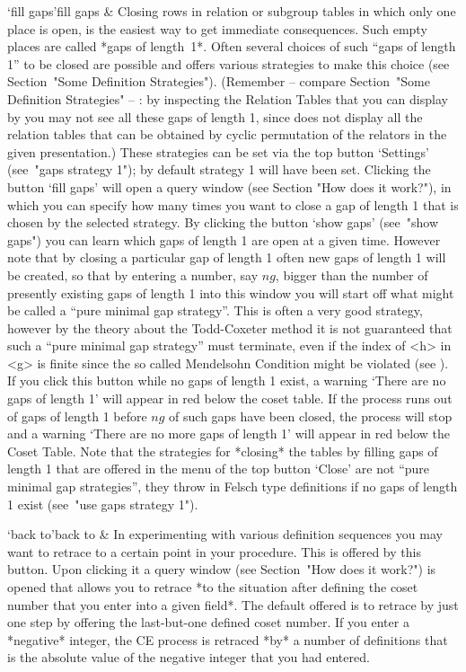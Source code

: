 \>`fill gaps'{fill gaps} &
  Closing rows in relation or subgroup tables in which only one place is
  open, is the easiest way to get immediate consequences. Such empty
  places are called *gaps of length~1*. Often several choices of such
  ``gaps of length 1'' to be closed are possible and {\ITC} offers
  various strategies to make this choice (see Section~"Some Definition
  Strategies"). (Remember -- compare Section~"Some Definition
  Strategies" -- : by inspecting the Relation Tables that you can
  display by {\ITC} you may not see all these gaps of length 1, since
  {\ITC} does not display all the relation tables that can be obtained
  by cyclic permutation of the relators in the given presentation.)
  These strategies can be set via the top button `Settings' (see~"gaps
  strategy 1"); by default strategy 1 will have been set. Clicking
  the button `fill gaps' will open a query window (see Section "How does
  it work?"), in which you can specify how many times you want to close
  a gap of length 1 that is chosen by the selected strategy. By
  clicking the button `show gaps' (see~"show gaps") you can learn which
  gaps of length 1 are open at a given time. However note that by
  closing a particular gap of length 1 often new gaps of length 1
  will be created, so that by entering a number, say $ng$, bigger than
  the number of presently existing gaps of length 1 into this window
  you will start off what might be called a ``pure minimal gap strategy''.
  This is often a very good strategy, however by the theory about the
  Todd-Coxeter method it is not guaranteed that such a ``pure minimal gap
  strategy'' must terminate, even if the index of <h> in <g> is finite
  since the so called Mendelsohn Condition might be violated (see
  \cite{Neu82}). If you click this button while no gaps of length 1
  exist, a warning `There are no gaps of length 1' will appear in red
  below the coset table. If the process runs out of gaps of length 1
  before $ng$ of such gaps have been closed, the process will stop and a
  warning `There are no more gaps of length 1' will appear in red below
  the Coset Table. Note that the strategies for *closing* the tables by
  filling gaps of length 1 that are offered in the menu of the top
  button `Close' are not ``pure minimal gap strategies'', they throw in
  Felsch type definitions if no gaps of length 1 exist (see~"use gaps
  strategy 1").



\>`back to'{back to} &
  In experimenting with various definition sequences you may want to
  retrace to a certain point in your procedure. This is offered by this
  button. Upon clicking it a query window (see Section~"How does it
  work?") is opened that allows you to retrace *to the situation after
  defining the coset number that you enter into a given field*. The
  default offered is to retrace by just one step by offering the
  last-but-one defined coset number. If you enter a *negative* integer,
  the CE process is retraced *by* a number of definitions that is the
  absolute value of the negative integer that you had entered.


